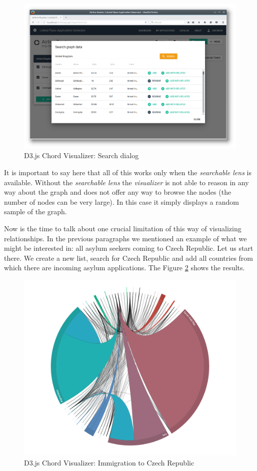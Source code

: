\begin{figure}
	\centering
	\includegraphics[width=145mm]{img/06_chord_search_dialog}
	\caption{D3.js Chord Visualizer: Search dialog}
    \label{fig:chord-search-dialog}
\end{figure}

It is important to say here that all of this works only when the \emph{searchable lens} is available. Without the \emph{searchable lens} the \emph{visualizer} is not able to reason in any way about the graph and does not offer any way to browse the nodes (the number of nodes can be very large). In this case it simply displays a random sample of the graph.

Now is the time to talk about one crucial limitation of this way of visualizing relationships. In the previous paragraphs we mentioned an example of what we might be interested in: all asylum seekers coming to Czech Republic. Let us start there. We create a new list, search for Czech Republic and add all countries from which there are incoming asylum applications. The Figure \ref{fig:chord-immigration-to-cr-1} shows the results.

\begin{figure}
	\centering
	\includegraphics[width=145mm]{img/06_chord_immigration_to_cr_1}
	\caption{D3.js Chord Visualizer: Immigration to Czech Republic}
    \label{fig:chord-immigration-to-cr-1}
\end{figure}


